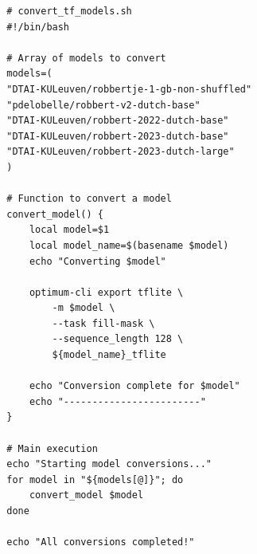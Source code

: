 \begin{listing}
    \begin{verbatim}
        # convert_tf_models.sh
        #!/bin/bash
        
        # Array of models to convert
        models=(
        "DTAI-KULeuven/robbertje-1-gb-non-shuffled"
        "pdelobelle/robbert-v2-dutch-base"
        "DTAI-KULeuven/robbert-2022-dutch-base"
        "DTAI-KULeuven/robbert-2023-dutch-base"
        "DTAI-KULeuven/robbert-2023-dutch-large"
        )
        
        # Function to convert a model
        convert_model() {
            local model=$1
            local model_name=$(basename $model)
            echo "Converting $model"
            
            optimum-cli export tflite \
                -m $model \
                --task fill-mask \
                --sequence_length 128 \
                ${model_name}_tflite
            
            echo "Conversion complete for $model"
            echo "------------------------"
        }
        
        # Main execution
        echo "Starting model conversions..."
        for model in "${models[@]}"; do
            convert_model $model
        done
        
        echo "All conversions completed!"
    \end{verbatim}
    \caption[\texttt{convert\_tf\_models.sh}]{Het \texttt{convert\_tf\_models.sh} script voert de conversie van de \gls{robbert}-modellen uit naar het -formaat zonder kwantisering. Het maakt gebruik van de \texttt{optimum-cli} en exporteert met een vaste sequentielengte van 128 tokens.}
    \label{lst:convert-tf-models}
\end{listing}


